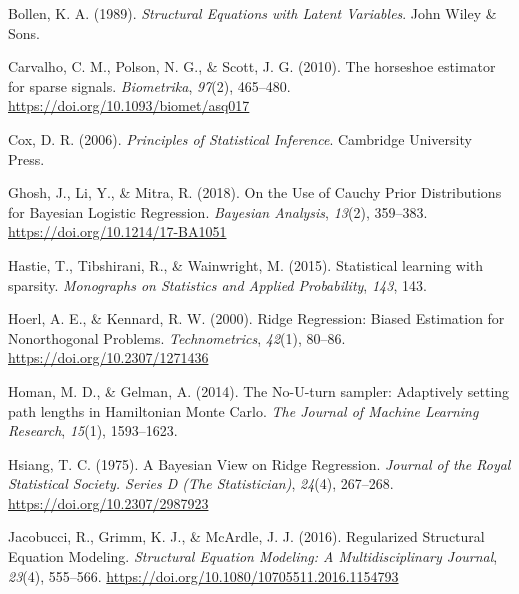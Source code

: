 \documentclass[
  man,floatsintext]{apa6}
\newlength{\cslhangindent}
\newlength{\cslentryspacingunit} %
\newenvironment{CSLReferences}[2] %
 {%
  \setlength{\parindent}{0pt}
  \ifodd #1
  \let\oldpar\par
  \def\par{\hangindent=\cslhangindent\oldpar}
  \fi
  \setlength{\parskip}{#2\cslentryspacingunit}
 }%
 {}
\begin{document}
\hypertarget{refs}{}
\begin{CSLReferences}{1}{0}
\leavevmode{}%
Bollen, K. A. (1989). \emph{Structural {Equations} with {Latent} {Variables}}. John Wiley \& Sons.

\leavevmode{}%
Carvalho, C. M., Polson, N. G., \& Scott, J. G. (2010). The horseshoe estimator for sparse signals. \emph{Biometrika}, \emph{97}(2), 465--480. \url{https://doi.org/10.1093/biomet/asq017}

\leavevmode{}%
Cox, D. R. (2006). \emph{Principles of {Statistical} {Inference}}. Cambridge University Press.

\leavevmode{}%
Ghosh, J., Li, Y., \& Mitra, R. (2018). On the {Use} of {Cauchy} {Prior} {Distributions} for {Bayesian} {Logistic} {Regression}. \emph{Bayesian Analysis}, \emph{13}(2), 359--383. \url{https://doi.org/10.1214/17-BA1051}

\leavevmode{}%
Hastie, T., Tibshirani, R., \& Wainwright, M. (2015). Statistical learning with sparsity. \emph{Monographs on Statistics and Applied Probability}, \emph{143}, 143.

\leavevmode{}%
Hoerl, A. E., \& Kennard, R. W. (2000). Ridge {Regression}: {Biased} {Estimation} for {Nonorthogonal} {Problems}. \emph{Technometrics}, \emph{42}(1), 80--86. \url{https://doi.org/10.2307/1271436}

\leavevmode{}%
Homan, M. D., \& Gelman, A. (2014). The {No}-{U}-turn sampler: Adaptively setting path lengths in {Hamiltonian} {Monte} {Carlo}. \emph{The Journal of Machine Learning Research}, \emph{15}(1), 1593--1623.

\leavevmode{}%
Hsiang, T. C. (1975). A {Bayesian} {View} on {Ridge} {Regression}. \emph{Journal of the Royal Statistical Society. Series D (The Statistician)}, \emph{24}(4), 267--268. \url{https://doi.org/10.2307/2987923}

\leavevmode{}%
Jacobucci, R., Grimm, K. J., \& McArdle, J. J. (2016). Regularized {Structural} {Equation} {Modeling}. \emph{Structural Equation Modeling: A Multidisciplinary Journal}, \emph{23}(4), 555--566. \url{https://doi.org/10.1080/10705511.2016.1154793}


\end{CSLReferences}
\end{document}
